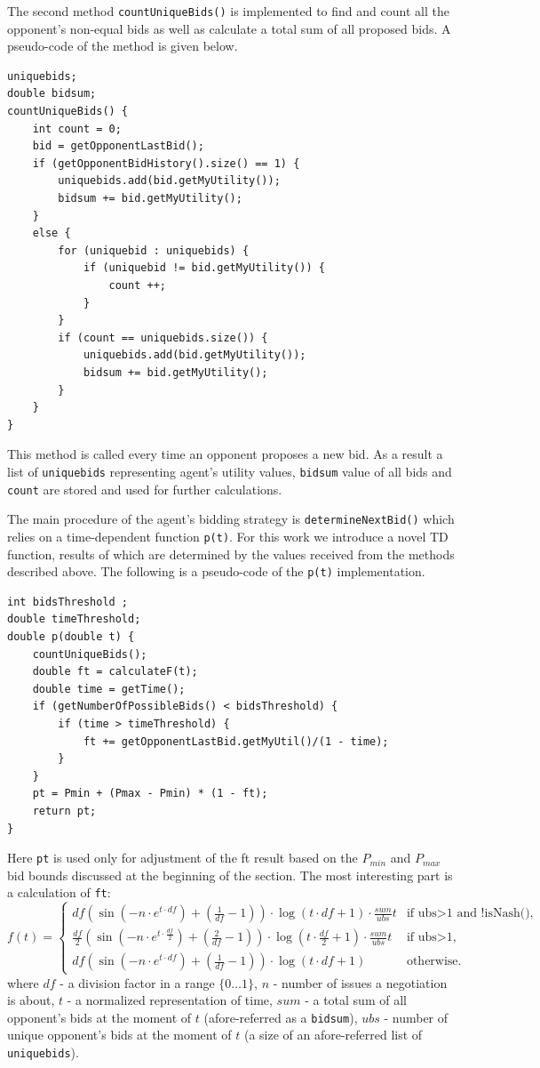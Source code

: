 \documentclass[html]{report}    %
\begin{document}
The second method \texttt{countUniqueBids()} is implemented to find and count all the opponent's non-equal bids as well as calculate a total sum of all proposed bids. A pseudo-code of the method is given below.
\begin{verbatim}
uniquebids;
double bidsum;
countUniqueBids() {
    int count = 0;
    bid = getOpponentLastBid();	
    if (getOpponentBidHistory().size() == 1) {
        uniquebids.add(bid.getMyUtility());
        bidsum += bid.getMyUtility();
    }
    else {
        for (uniquebid : uniquebids) {
            if (uniquebid != bid.getMyUtility()) {
                count ++;
            }
        }
        if (count == uniquebids.size()) {
            uniquebids.add(bid.getMyUtility());
            bidsum += bid.getMyUtility();
        }
    }
}  
\end{verbatim}
This method is called every time an opponent proposes a new bid. As a result a list of \texttt{uniquebids} representing agent's utility values, \texttt{bidsum} value of all bids and \texttt{count} are stored and used for further calculations.

The main procedure of the agent's bidding strategy is \texttt{determineNextBid()} which relies on a time-dependent function \texttt{p(t)}. For this work we introduce a novel TD function, results of which are determined by the values received from the methods described above. The following is a pseudo-code of the \texttt{p(t)} implementation.
\begin{verbatim}
int bidsThreshold ;
double timeThreshold;
double p(double t) {
    countUniqueBids();
    double ft = calculateF(t);
    double time = getTime();
    if (getNumberOfPossibleBids() < bidsThreshold) {
        if (time > timeThreshold) {
            ft += getOpponentLastBid.getMyUtil()/(1 - time);
        }
    }
    pt = Pmin + (Pmax - Pmin) * (1 - ft);
    return pt;
}
\end{verbatim}
Here \texttt{pt} is used only for adjustment of the ft result based on the $P_{min}$ and $P_{max}$ bid bounds discussed at the beginning of the section. The most interesting part is a calculation of \texttt{ft}:
\begin{equation} \label{1}
	f(t) = \begin{cases}
			df(\sin(-n\cdot e^{t\cdot df})+(\frac{1}{df}-1))\cdot\log(t\cdot df+1)\cdot\frac{sum}{ubs}t &\text{if ubs$>$1 and !isNash(),}\\
			\frac{df}{2}(\sin(-n\cdot e^{t\cdot\frac{df}{2}})+(\frac{2}{df}-1))\cdot\log(t\cdot \frac{df}{2}+1)\cdot\frac{sum}{ubs}t &\text{if ubs$>$1,}\\
			df(\sin(-n\cdot e^{t\cdot df})+(\frac{1}{df}-1))\cdot\log(t\cdot df+1) &\text{otherwise.}
			\end{cases}
\end{equation}
where $df$ - a division factor in a range $\{0\dots1\}$, $n$ - number of issues a negotiation is about, $t$ - a normalized representation of time, $sum$ - a total sum of all opponent's bids at the moment of $t$ (afore-referred as a \texttt{bidsum}), $ubs$ - number of unique opponent's bids at the moment of $t$ (a size of an afore-referred list of \texttt{uniquebids}).
\end{document}
